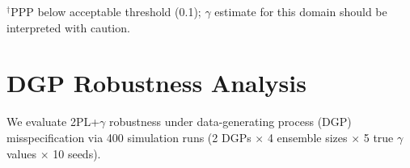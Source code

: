 \begin{table}[h]
\centering
\caption{Per-domain $\gamma$ estimates (2PL+$\gamma$, Qwen2.5) at $J$=13 and $J$=16. All $J$=16 fits converge ($\hat{R} < 1.01$). Social Sciences $P(\gamma\!<\!0)$ strengthens from 99.1\% to 99.7\% at $J$=16, exceeding the Bonferroni-corrected threshold ($99.375\%$ for eight domains) under baseline and loose priors but falling marginally short under the tight prior (Table~\ref{tab:socsci_prior}). Results remain exploratory at these ensemble sizes \citep{gelman2012why}. ARC-Challenge is excluded (PPP $<$ 0.05 at all $J$).}
\label{tab:domain_gamma}
\footnotesize
{}

\vspace{2pt}
{\scriptsize $^\dagger$PPP below acceptable threshold (0.1); $\gamma$ estimate for this domain should be interpreted with caution.}
\end{table}

\section{DGP Robustness Analysis}
\label{sec:threshold_dgp}

We evaluate 2PL+$\gamma$ robustness under data-generating process (DGP) misspecification via 400 simulation runs (2 DGPs $\times$ 4 ensemble sizes $\times$ 5 true $\gamma$ values $\times$ 10 seeds).

